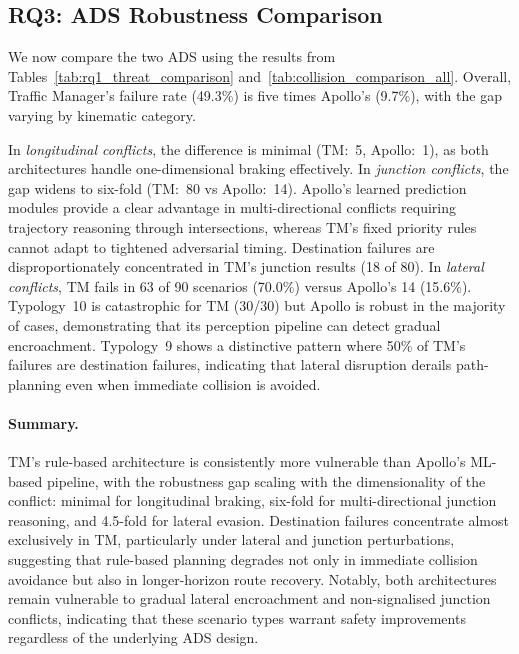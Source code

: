 \subsection{RQ3: ADS Robustness Comparison}

We now compare the two ADS using the results from Tables~\ref{tab:rq1_threat_comparison} and~\ref{tab:collision_comparison_all}. Overall, Traffic Manager's failure rate (49.3\%) is five times Apollo's (9.7\%), with the gap varying by kinematic category.

In \textit{longitudinal conflicts}, the difference is minimal (TM:~5, Apollo:~1), as both architectures handle one-dimensional braking effectively. In \textit{junction conflicts}, the gap widens to six-fold (TM:~80 vs Apollo:~14). Apollo's learned prediction modules provide a clear advantage in multi-directional conflicts requiring trajectory reasoning through intersections, whereas TM's fixed priority rules cannot adapt to tightened adversarial timing. Destination failures are disproportionately concentrated in TM's junction results (18 of 80). In \textit{lateral conflicts}, TM fails in 63 of 90 scenarios (70.0\%) versus Apollo's 14 (15.6\%). Typology~10 is catastrophic for TM (30/30) but Apollo is robust in the majority of cases, demonstrating that its perception pipeline can detect gradual encroachment. Typology~9 shows a distinctive pattern where 50\% of TM's failures are destination failures, indicating that lateral disruption derails path-planning even when immediate collision is avoided.

\paragraph{Summary.}
TM's rule-based architecture is consistently more vulnerable than Apollo's ML-based pipeline, with the robustness gap scaling with the dimensionality of the conflict: minimal for longitudinal braking, six-fold for multi-directional junction reasoning, and 4.5-fold for lateral evasion. Destination failures concentrate almost exclusively in TM, particularly under lateral and junction perturbations, suggesting that rule-based planning degrades not only in immediate collision avoidance but also in longer-horizon route recovery. Notably, both architectures remain vulnerable to gradual lateral encroachment and non-signalised junction conflicts, indicating that these scenario types warrant safety improvements regardless of the underlying ADS design.

